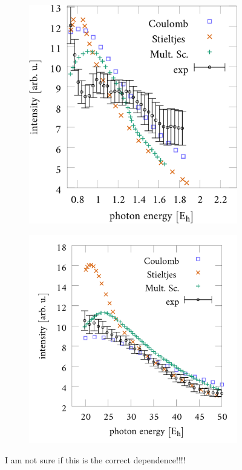 \begin{figure}
\begin{subfigure}{0.5\textwidth}
\includegraphics[width=\textwidth]{Figures/CO2/pi_gRef}
\end{subfigure}
\begin{subfigure}{0.5\textwidth}
\includegraphics[width=\textwidth]{Figures/CO2/pi_uRef}
\end{subfigure}
\caption{I am not sure if this is the correct dependence!!!!}
\label{fig:piRef}
\end{figure}

